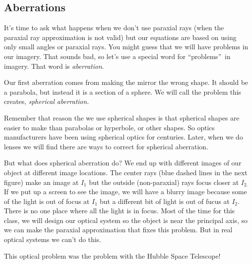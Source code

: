 \documentclass{article}
\begin{document}
\subsection{Aberrations}

It's time to ask what happens when we don't use paraxial rays (when the
paraxial ray approximation is not valid) but our equations are based on
using only small angles or paraxial rays. You might guess that we will have
problems in our imagery. That sounds bad, so let's use a special word for
\textquotedblleft problems\textquotedblright\ in imagery. That word is \emph{%
aberration}.

Our first aberration comes from making the mirror the wrong shape. It should
be a parabola, but instead it is a section of a sphere. We will call the
problem this creates, \emph{spherical aberration.}

Remember that reason the we use spherical shapes is that spherical shapes
are easier to make than parabolas or hyperbole, or other shapes. So optics
manufacturers have been using spherical optics for centuries. Later, when we
do lenses we will find there are ways to correct for spherical aberration.

But what does spherical aberration do? We end up with different images of
our object at different image locations. The center rays (blue dashed lines
in the next figure) make an image at $I_{1}$ but the outside (non-paraxial)
rays focus closer at $I_{2.}$ If we put up a screen to see the image, we
will have a blurry image because some of the light is out of focus at $I_{1}$
but a different bit of light is out of fucus at $I_{2}.$ There is no one
place where all the light is in focus. Most of the time for this class,
we will design our optical system so the object is near the principal axis,
so we can make the paraxial approximation that fixes this problem. But in
real optical systems we can't do this.

This optical problem was the problem with the Hubble Space Telescope!

\end{document}
